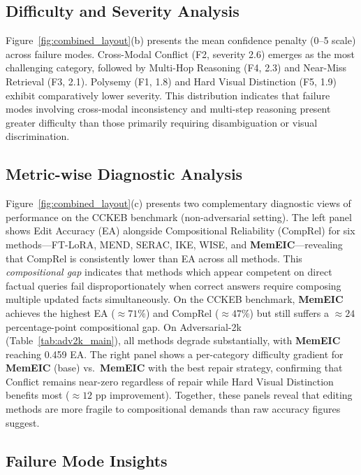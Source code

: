 \documentclass{article}
\newcommand{\memeic}{\textbf{MemEIC}}
\begin{document}
\subsection{Difficulty and Severity Analysis}

Figure~\ref{fig:combined_layout}(b) presents the mean confidence penalty (0--5 scale) across failure modes. Cross-Modal Conflict (F2, severity 2.6) emerges as the most challenging category, followed by Multi-Hop Reasoning (F4, 2.3) and Near-Miss Retrieval (F3, 2.1). Polysemy (F1, 1.8) and Hard Visual Distinction (F5, 1.9) exhibit comparatively lower severity. This distribution indicates that failure modes involving cross-modal inconsistency and multi-step reasoning present greater difficulty than those primarily requiring disambiguation or visual discrimination.

\subsection{Metric-wise Diagnostic Analysis}

Figure~\ref{fig:combined_layout}(c) presents two complementary diagnostic views of performance on the CCKEB benchmark (non-adversarial setting). The left panel shows Edit Accuracy (EA) alongside Compositional Reliability (CompRel) for six methods---FT-LoRA, MEND, SERAC, IKE, WISE, and \memeic{}---revealing that CompRel is consistently lower than EA across all methods. This \emph{compositional gap} indicates that methods which appear competent on direct factual queries fail disproportionately when correct answers require composing multiple updated facts simultaneously. On the CCKEB benchmark, \memeic{} achieves the highest EA ($\approx71\%$) and CompRel ($\approx47\%$) but still suffers a $\approx24$ percentage-point compositional gap. On Adversarial-2k (Table~\ref{tab:adv2k_main}), all methods degrade substantially, with \memeic{} reaching 0.459 EA. The right panel shows a per-category difficulty gradient for \memeic{} (base) vs.\ \memeic{} with the best repair strategy, confirming that Conflict remains near-zero regardless of repair while Hard Visual Distinction benefits most ($\approx12$ pp improvement). Together, these panels reveal that editing methods are more fragile to compositional demands than raw accuracy figures suggest.

\subsection{Failure Mode Insights}
\end{document}
